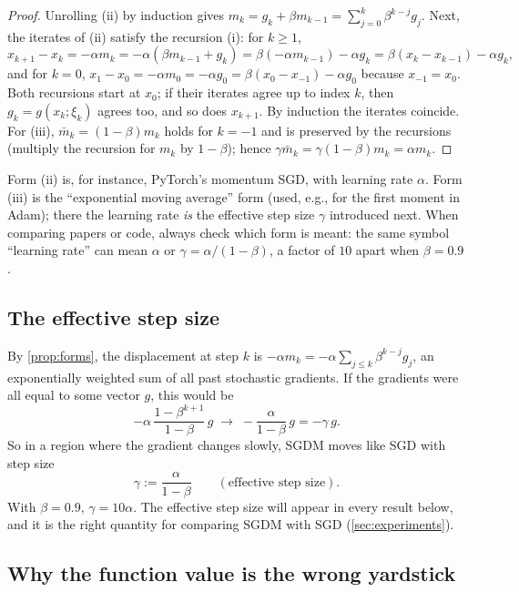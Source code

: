 \begin{proof}
Unrolling (ii) by induction gives $m_k=g_k+\beta m_{k-1}=\sum_{j=0}^k\beta^{k-j}g_j$.
Next, the iterates of (ii) satisfy the recursion (i): for $k\ge1$,
\[
  x_{k+1}-x_k=-\alpha m_k=-\alpha(\beta m_{k-1}+g_k)=\beta(-\alpha m_{k-1})-\alpha g_k
  =\beta(x_k-x_{k-1})-\alpha g_k,
\]
and for $k=0$, $x_1-x_0=-\alpha m_0=-\alpha g_0=\beta(x_0-x_{-1})-\alpha g_0$ because
$x_{-1}=x_0$. Both recursions start at $x_0$; if their iterates agree up to index $k$, then
$g_k=g(x_k;\xi_k)$ agrees too, and so does $x_{k+1}$. By induction the iterates coincide.
For (iii), $\bar m_k=(1-\beta)m_k$ holds for $k=-1$ and is preserved by the recursions
(multiply the recursion for $m_k$ by $1-\beta$); hence $\gamma\bar m_k=\gamma(1-\beta)m_k=\alpha m_k$.
\end{proof}

Form (ii) is, for instance, PyTorch's momentum SGD, with learning rate $\alpha$. Form (iii)
is the ``exponential moving average'' form (used, e.g., for the first moment in Adam);
there the learning rate \emph{is} the effective step size $\gamma$ introduced next. When
comparing papers or code, always check which form is meant: the same symbol ``learning
rate'' can mean $\alpha$ or $\gamma=\alpha/(1-\beta)$, a factor of $10$ apart when $\beta=0.9$.

\subsection{The effective step size}\label{sec:effective}

By \cref{prop:forms}, the displacement at step $k$ is $-\alpha m_k=-\alpha\sum_{j\le k}\beta^{k-j}g_j$,
an exponentially weighted sum of all past stochastic gradients. If the gradients were all
equal to some vector $g$, this would be
\[
  -\alpha\,\frac{1-\beta^{k+1}}{1-\beta}\,g\;\longrightarrow\;-\frac{\alpha}{1-\beta}\,g=-\gamma\,g .
\]
So in a region where the gradient changes slowly, SGDM moves like SGD with step size
\begin{equation}\label{eq:gamma}
  \gamma:=\frac{\alpha}{1-\beta}\qquad(\text{effective step size}).
\end{equation}
With $\beta=0.9$, $\gamma=10\alpha$. The effective step size will appear in every result
below, and it is the right quantity for comparing SGDM with SGD (\cref{sec:experiments}).

\subsection{Why the function value is the wrong yardstick}\label{sec:naive}

